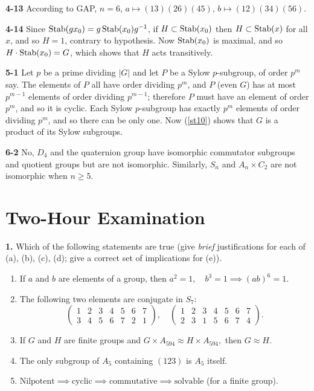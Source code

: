 \documentclass[a4paper,11pt,final]{memoir}%
\theoremstyle{nonumberplain}
\begin{document}
\bigskip\noindent\textbf{4-13}
According to GAP, $n=6$, $a\mapsto(13)(26)(45)$, $b\mapsto(12)(34)(56)$.

\bigskip\noindent\textbf{4-14}
Since $\operatorname{Stab}(gx_{0})=g\operatorname{Stab}(x_{0})g^{-1}$, if $H\subset\operatorname{Stab}(x_{0})$ then
$H\subset\operatorname{Stab}(x)$ for all $x$, and so $H=1$, contrary to hypothesis. Now
$\operatorname{Stab}(x_{0})$ is maximal, and so $H\cdot\operatorname{Stab}(x_{0})=G$, which shows that $H$
acts transitively.

\bigskip\noindent\textbf{5-1}
Let $p$ be a prime dividing $|G|$ and let $P$ be a Sylow $p$-subgroup, of
order $p^{m}$ say. The elements of $P$ all have order dividing $p^{m}$, and $P$
(even $G$) has at most $p^{m-1}$ elements of order dividing $p^{m-1}$; therefore $P$ must have an element of
order $p^{m}$, and so it is cyclic. Each Sylow $p$-subgroup has exactly
$p^{m}$ elements of order dividing $p^{m}$, and so there can be only one. Now
(\ref{st10}) shows that $G$ is a product of its Sylow subgroups.

\bigskip\noindent\textbf{6-2}
No, $D_{4}$ and the quaternion group have isomorphic commutator subgroups and
quotient groups but are not isomorphic. Similarly, $S_{n}$ and $A_{n}\times
C_{2}$ are not isomorphic when $n\geq5$.



\clearpage


\clearpage


\chapter{Two-Hour Examination}

\noindent\textbf{1.} Which of the following statements are true (give
\textit{brief} justifications for each of (a), (b), (c), (d); give a correct
set of implications for (e)).

\begin{enumerate}
\item If $a$ and $b$ are elements of a group, then $a^{2}=1,\quad
b^{3}=1\implies(ab)^{6}=1$.

\item The following two elements are conjugate in $S_{7}$:
\[%
\begin{pmatrix}
1 & 2 & 3 & 4 & 5 & 6 & 7\\
3 & 4 & 5 & 6 & 7 & 2 & 1
\end{pmatrix}
,\quad%
\begin{pmatrix}
1 & 2 & 3 & 4 & 5 & 6 & 7\\
2 & 3 & 1 & 5 & 6 & 7 & 4
\end{pmatrix}
.
\]


\item If $G$ and $H$ are finite groups and $G\times A_{594}\approx H\times
A_{594},$ then $G\approx H$.

\item The only subgroup of $A_{5}$ containing $(123)$ is $A_{5}$ itself.

\item $\text{Nilpotent}\implies\text{cyclic}\implies\text{commutative}%
\implies\text{solvable}$ (for a finite group).
\end{enumerate}
\end{document}
